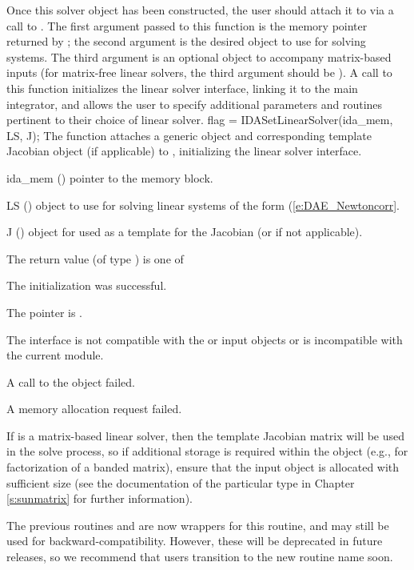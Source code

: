 Once this solver object has been constructed, the user should attach
it to {\ida} via a call to .  The first argument
passed to this function is the {\ida} memory pointer returned by
; the second argument is the desired {\sunlinsol} object
to use for solving systems.  The third argument is an optional
{\sunmatrix} object to accompany matrix-based {\sunlinsol} inputs (for
matrix-free linear solvers, the third argument should be ).
A call to this function initializes the {\idals} linear solver
interface, linking it to the main {\ida} integrator, and allows the
user to specify additional parameters and routines pertinent to their
choice of linear solver.
{
  flag = IDASetLinearSolver(ida\_mem, LS, J);
}
{
  The function  attaches a generic {\sunlinsol}
  object  and corresponding template Jacobian {\sunmatrix}
  object  (if applicable) to {\ida}, initializing the {\idals}
  linear solver interface.
}
{
  \begin{args}
  \item[ida\_mem] ()
    pointer to the {\ida} memory block.
  \item[LS] ()
    {\sunlinsol} object to use for solving linear systems of the form
    (\ref{e:DAE_Newtoncorr}.
  \item[J] ()
    {\sunmatrix} object for used as a template for the Jacobian (or
     if not applicable).
  \end{args}
}
{
  The return value  (of type ) is one of
  \begin{args}
  \item[\Id{IDALS\_SUCCESS}]
    The {\idals} initialization was successful.
  \item[\Id{IDALS\_MEM\_NULL}]
    The  pointer is .
  \item[\Id{IDALS\_ILL\_INPUT}]
    The {\idals} interface is not compatible with the  or
     input objects or is incompatible with the current
    {\nvector} module.
  \item[\Id{IDALS\_SUNLS\_FAIL}]
    A call to the  object failed.
  \item[\Id{IDALS\_MEM\_FAIL}]
    A memory allocation request failed.
  \end{args}
}
{
  If  is a matrix-based linear solver, then the template
  Jacobian matrix  will be used in the solve process, so if
  additional storage is required within the {\sunmatrix} object
  (e.g., for factorization of a banded matrix), ensure that the input
  object is allocated with sufficient size (see the documentation of
  the particular {\sunmatrix} type in Chapter \ref{s:sunmatrix} for
  further information).

  The previous routines  and
   are now wrappers for this routine, and may
  still be used for backward-compatibility.  However, these will be
  deprecated in future releases, so we recommend that users transition
  to the new routine name soon.
}
